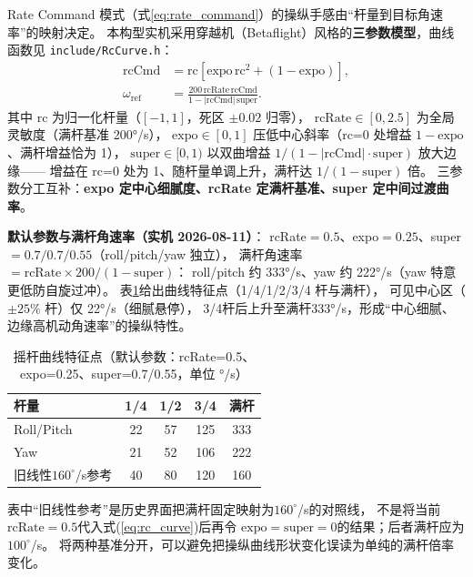 Rate Command 模式（式\ref{eq:rate_command}）的操纵手感由“杆量到目标角速率”的映射决定。
本构型实机采用穿越机（Betaflight）风格的\textbf{三参数模型}，曲线函数见 \texttt{include/RcCurve.h}：
\begin{equation}
\begin{aligned}
    \mathrm{rcCmd}&=\mathrm{rc}\left[\mathrm{expo}\,\mathrm{rc}^2+(1-\mathrm{expo})\right],\\
    \omega_{\mathrm{ref}}&=
    \frac{200\,\mathrm{rcRate}\,\mathrm{rcCmd}}
    {1-|\mathrm{rcCmd}|\,\mathrm{super}} .
\end{aligned}
    \label{eq:rc_curve}
\end{equation}
其中 rc 为归一化杆量（$[-1,1]$，死区 $\pm0.02$ 归零），
$\text{rcRate}\in[0,2.5]$ 为全局灵敏度（满杆基准 200°/s），
$\text{expo}\in[0,1]$ 压低中心斜率（rc=0 处增益 $1-\text{expo}$、满杆增益恰为 1），
$\text{super}\in[0,1)$ 以双曲增益 $1/(1-|\text{rcCmd}|\cdot\text{super})$ 放大边缘——
增益在 rc=0 处为 1、随杆量单调上升，满杆达 $1/(1-\text{super})$ 倍。
三参数分工互补：\textbf{expo 定中心细腻度、rcRate 定满杆基准、super 定中间过渡曲率}。

\textbf{默认参数与满杆角速率（实机 2026-08-11）}：
rcRate$=0.5$、expo$=0.25$、super$=0.7/0.7/0.55$（roll/pitch/yaw 独立），
满杆角速率 $=\text{rcRate}\times 200/(1-\text{super})$：
roll/pitch 约 333°/s、yaw 约 222°/s（yaw 特意更低防自旋过冲）。
表\ref{tab:rc_curve_points}给出曲线特征点（1/4/1/2/3/4 杆与满杆），
可见中心区（$\pm25\%$ 杆）仅 22°/s（细腻悬停），
3/4杆后上升至满杆333°/s，形成“中心细腻、边缘高机动角速率”的操纵特性。

\begin{table}[H]
\centering
\caption{摇杆曲线特征点（默认参数：rcRate=0.5、expo=0.25、super=0.7/0.55，单位 °/s）}
\label{tab:rc_curve_points}
\begin{tabular}{l c c c c}
\toprule
杆量 & 1/4 & 1/2 & 3/4 & 满杆 \\
\midrule
Roll/Pitch & 22 & 57 & 125 & 333 \\
Yaw & 21 & 52 & 106 & 222 \\
旧线性$160^\circ$/s参考 & 40 & 80 & 120 & 160 \\
\bottomrule
\end{tabular}
\end{table}

表中“旧线性参考”是历史界面把满杆固定映射为$160^\circ$/s的对照线，
不是将当前$\mathrm{rcRate}=0.5$代入式(\ref{eq:rc_curve})后再令
$\mathrm{expo}=\mathrm{super}=0$的结果；后者满杆应为$100^\circ$/s。
将两种基准分开，可以避免把操纵曲线形状变化误读为单纯的满杆倍率变化。

